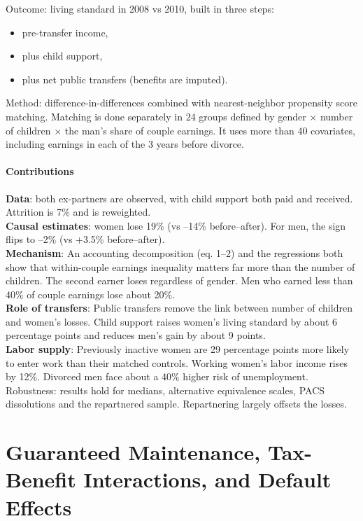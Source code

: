 \documentclass{article}
\begin{document}
\noindent Outcome: living standard in 2008 vs 2010, built in three steps:
\begin{itemize}
    \item pre-transfer income,
    \item plus child support,
    \item plus net public transfers (benefits are imputed).
\end{itemize}

\noindent Method: difference-in-differences combined with nearest-neighbor propensity score matching.
Matching is done separately in 24 groups defined by gender × number of children × the man’s share of couple earnings.
It uses more than 40 covariates, including earnings in each of the 3 years before divorce.

\paragraph{Contributions} \textbf{Data}: both ex-partners are observed, with child support both paid and received. Attrition is 7\% and is reweighted. \\
\noindent \textbf{Causal estimates}: women lose 19\% (vs –14\% before–after). For men, the sign flips to –2\% (vs +3.5\% before–after). \\
\noindent \textbf{Mechanism}: An accounting decomposition (eq. 1–2) and the regressions both show that within-couple earnings inequality matters far more than the number of children.
The second earner loses regardless of gender. Men who earned less than 40\% of couple earnings lose about 20\%. \\
\noindent \textbf{Role of transfers}: Public transfers remove the link between number of children and women’s losses.
Child support raises women’s living standard by about 6 percentage points and reduces men’s gain by about 9 points. \\
\noindent \textbf{Labor supply}: Previously inactive women are 29 percentage points more likely to enter work than their matched controls.
Working women’s labor income rises by 12\%. Divorced men face about a 40\% higher risk of unemployment.
Robustness: results hold for medians, alternative equivalence scales, PACS dissolutions and the repartnered sample. Repartnering largely offsets the losses.

\section{Guaranteed Maintenance, Tax-Benefit Interactions, and Default Effects}
\end{document}
